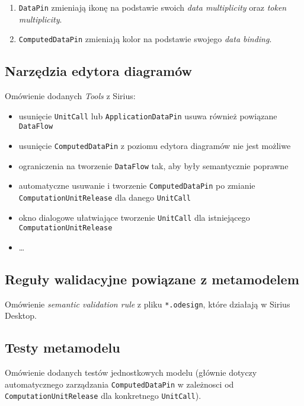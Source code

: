 \begin{enumerate}
	\item \texttt{DataPin} zmieniają ikonę na podstawie swoich \textit{data
		      multiplicity} oraz \textit{token multiplicity}.
	\item \texttt{ComputedDataPin} zmieniają kolor na podstawie swojego
	      \textit{data binding}.
\end{enumerate}

\subsection{Narzędzia edytora diagramów}

Omówienie dodanych \textit{Tools} z Sirius:

\begin{itemize}
	\item usunięcie \texttt{UnitCall} lub \texttt{ApplicationDataPin} usuwa również powiązane \texttt{DataFlow}
	\item usunięcie \texttt{ComputedDataPin} z poziomu edytora diagramów nie jest możliwe
	\item ograniczenia na tworzenie \texttt{DataFlow} tak, aby były semantycznie poprawne
	\item automatyczne usuwanie i tworzenie \texttt{ComputedDataPin} po zmianie \texttt{ComputationUnitRelease} dla danego \texttt{UnitCall}
	\item okno dialogowe ułatwiające tworzenie \texttt{UnitCall} dla istniejącego \texttt{ComputationUnitRelease}
	\item \ldots
\end{itemize}

\subsection{Reguły walidacyjne powiązane z
	metamodelem}\label{sec:regulky-walidacyjne-metamodel}

Omówienie \textit{semantic validation rule} z pliku \texttt{*.odesign}, które
działają w Sirius Desktop.

\subsection{Testy metamodelu}

Omówienie dodanych testów jednostkowych modelu (głównie dotyczy automatycznego
zarządzania \texttt{ComputedDataPin} w zależnosci od
\texttt{ComputationUnitRelease} dla konkretnego \texttt{UnitCall}).

